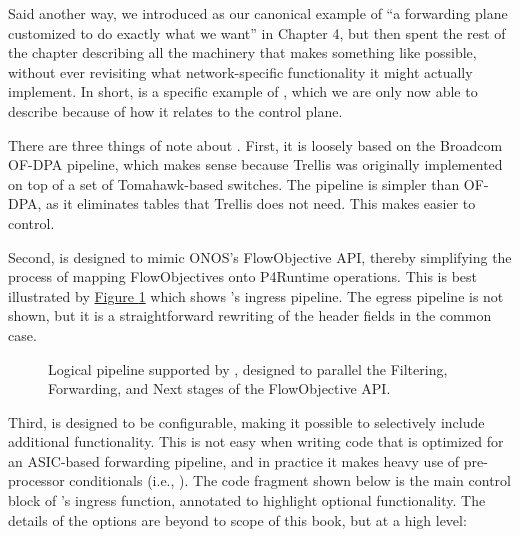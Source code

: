 \documentclass[letterpaper,11pt,english]{sphinxmanual}
\let\sphinxpxdimen\pdfpxdimen\else\newdimen\sphinxpxdimen
\begin{document}
Said another way, we introduced  as our canonical
example of “a forwarding plane customized to do exactly what we want”
in Chapter 4, but then spent the rest of the chapter describing all
the machinery that makes something like  possible,
without ever revisiting what network-specific functionality it might
actually implement.  In short,  is a specific example of
, which we are only now able to describe because of how
it relates to the control plane.

There are three things of note about . First, it is
loosely based on the Broadcom OF-DPA pipeline, which makes sense
because Trellis was originally implemented on top of a set of
Tomahawk-based switches. The  pipeline is simpler than
OF-DPA, as it eliminates tables that Trellis does not need. This makes
 easier to control.

Second,  is designed to mimic ONOS’s FlowObjective API,
thereby simplifying the process of mapping FlowObjectives onto
P4Runtime operations. This is best illustrated by \hyperref[\detokenize{trellis:fig-fabric}]{Figure \ref{\detokenize{trellis:fig-fabric}}} which shows ’s ingress pipeline. The
egress pipeline is not shown, but it is a straightforward rewriting of
the header fields in the common case.

\begin{figure}[htbp]
\centering
\capstart

\noindent\sphinxincludegraphics[width=500\sphinxpxdimen]{{Slide40}.png}
\caption{Logical pipeline supported by , designed to parallel
the Filtering, Forwarding, and Next stages of the FlowObjective API.}\label{\detokenize{trellis:id3}}\label{\detokenize{trellis:fig-fabric}}\end{figure}

Third,  is designed to be configurable, making it
possible to selectively include additional functionality. This is not
easy when writing code that is optimized for an ASIC-based forwarding
pipeline, and in practice it makes heavy use of pre-processor
conditionals (i.e., ). The code fragment shown below is the
main control block of ’s ingress function, annotated to
highlight optional functionality. The details of the options are
beyond to scope of this book, but at a high level:
\end{document}
